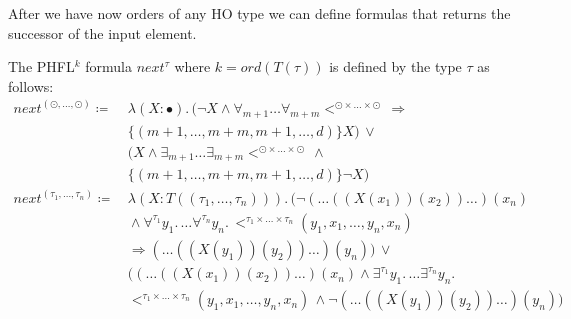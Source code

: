 After we have now orders of any HO type we can define formulas that returns the successor of the input element.

\begin{definition}
    The PHFL$^k$ formula $next^\tau$ where $k = ord(T(\tau))$ is defined by the type $\tau$ as follows:
    \begin{align*}
        next^{(\odot, \dots, \odot)} \coloneqq &\,\lambda (X \colon \bullet).\, (\neg X \wedge \forall_{m +
        1}\dots\forall_{m + m}<^{\odot \times \dots \times \odot}\, \Rightarrow \\&\,\{(m +
        1, \dots, m + m, m + 1, \dots, d)\} X) \,\vee \\&\,(X \wedge \exists_{m + 1}\dots\exists_{m + m} <^{\odot
        \times \dots \times \odot} \,\wedge \\&\,\{(m + 1, \dots, m + m, m + 1, \dots, d)\}
        \neg X)\\
        next^{(\tau_1, \dots, \tau_n)} \coloneqq &\,\lambda (X \colon T ((\tau_1, \dots, \tau_n))).\,(\neg (\dots((X
        (x_1))(x_2))\dots) (x_n) \\&\, \wedge \forall^{\tau_1}y_1.\, \dots \forall^{\tau_n}y_n.\,<^{\tau_1 \times
        \dots \times \tau_n}(y_1, x_1, \dots, y_n, x_n) \\&\,\Rightarrow  (\dots((X(y_1))(y_2))\dots)(y_n)) \,\vee
        \\&\,((\dots ((X(x_1))(x_2)) \dots)(x_n) \wedge \exists^{\tau_1}y_1.\, \dots \exists^{\tau_n}y_n.\, \\&\,
        <^{\tau_1 \times \dots \times \tau_n}
        (y_1, x_1,
        \dots, y_n, x_n)\,\wedge \neg (\dots((X(y_1))(y_2))\dots)(y_n))
    \end{align*}
\end{definition}


